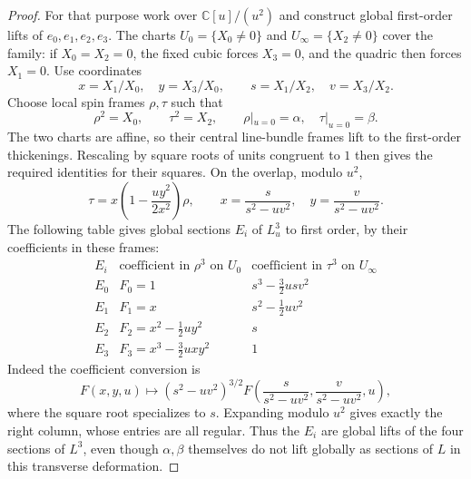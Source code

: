 \documentclass[11pt]{article}
\begin{document}
\begin{proof}
For that purpose work over $\mathbb C[u]/(u^2)$ and construct global
first-order lifts of $e_0,e_1,e_2,e_3$. The charts
$U_0=\{X_0\neq0\}$ and $U_\infty=\{X_2\neq0\}$ cover the family:
if $X_0=X_2=0$, the fixed cubic forces $X_3=0$, and the quadric then
forces $X_1=0$. Use coordinates
\[
x=X_1/X_0,\quad y=X_3/X_0,\qquad
s=X_1/X_2,\quad v=X_3/X_2.
\]
Choose local spin frames $\rho,\tau$ such that
\[
\rho^2=X_0,\qquad \tau^2=X_2,\qquad
\rho|_{u=0}=\alpha,\quad\tau|_{u=0}=\beta.
\]
The two charts are affine, so their central line-bundle frames lift to
the first-order thickenings. Rescaling by square roots of units
congruent to $1$ then gives the required identities for their squares.
On the overlap, modulo $u^2$,
\begin{equation}
\label{eq:spin-transition-first-order}
\tau=x\left(1-\frac{uy^2}{2x^2}\right)\rho,
\qquad
x=\frac{s}{s^2-uv^2},\quad y=\frac{v}{s^2-uv^2}.
\end{equation}
The following table gives global sections $E_i$ of $L_u^3$ to first
order, by their coefficients in these frames:
\begin{equation}
\label{eq:global-first-order-lifts}
\begin{array}{c|c|c}
 E_i &\text{coefficient} \text{ in }\rho^3\text{ on }U_0
 &\text{coefficient in }\tau^3\text{ on }U_\infty\\ \hline
E_0&F_0=1&s^3-\frac32usv^2\\
E_1&F_1=x&s^2-\frac12uv^2\\
E_2&F_2=x^2-\frac12uy^2&s\\
E_3&F_3=x^3-\frac32uxy^2&1
\end{array}
\end{equation}
Indeed the coefficient conversion is
\[
F(x,y,u)\longmapsto
(s^2-uv^2)^{3/2}
F\left(\frac{s}{s^2-uv^2},\frac{v}{s^2-uv^2},u\right),
\]
where the square root specializes to $s$. Expanding modulo $u^2$
gives exactly the right column, whose entries are all regular.
Thus the $E_i$ are global lifts of the four sections of $L^3$,
even though $\alpha,\beta$ themselves do not lift globally as sections
of $L$ in this transverse deformation.


\end{proof}
\end{document}
